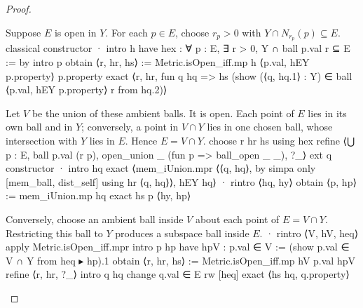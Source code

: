 \begin{proof}
  \begin{lean}{Suppose $E$ is open in $Y$. For each $p\in E$, choose $r_p>0$ with $Y\cap N_{r_p}(p)\subseteq E$.}
    classical
    constructor
    · intro h
      have hex : ∀ p : E, ∃ r > 0, Y ∩ ball p.val r ⊆ E := by
        intro p
        obtain ⟨r, hr, hs⟩ := Metric.isOpen_iff.mp h ⟨p.val, hEY p.property⟩ p.property
        exact ⟨r, hr, fun q hq => hs (show (⟨q, hq.1⟩ : Y) ∈ ball ⟨p.val, hEY p.property⟩ r from hq.2)⟩
  \end{lean}

  \begin{lean}{Let $V$ be the union of these ambient balls. It is open. Each point of $E$ lies in its own ball and in $Y$; conversely, a point in $V\cap Y$ lies in one chosen ball, whose intersection with $Y$ lies in $E$. Hence $E=V\cap Y$.}
    choose r hr hs using hex
    refine ⟨⋃ p : E, ball p.val (r p), open_union _ (fun p => ball_open _ _), ?_⟩
    ext q
    constructor
    · intro hq
      exact ⟨mem_iUnion.mpr ⟨⟨q, hq⟩, by simpa only [mem_ball, dist_self] using hr ⟨q, hq⟩⟩, hEY hq⟩
    · rintro ⟨hq, hy⟩
      obtain ⟨p, hp⟩ := mem_iUnion.mp hq
      exact hs p ⟨hy, hp⟩
  \end{lean}

  \begin{lean}{Conversely, choose an ambient ball inside $V$ about each point of $E=V\cap Y$. Restricting this ball to $Y$ produces a subspace ball inside $E$.}
    · rintro ⟨V, hV, heq⟩
      apply Metric.isOpen_iff.mpr
      intro p hp
      have hpV : p.val ∈ V := (show p.val ∈ V ∩ Y from heq ▸ hp).1
      obtain ⟨r, hr, hs⟩ := Metric.isOpen_iff.mp hV p.val hpV
      refine ⟨r, hr, ?_⟩
      intro q hq
      change q.val ∈ E
      rw [heq]
      exact ⟨hs hq, q.property⟩
  \end{lean}

\end{proof}
